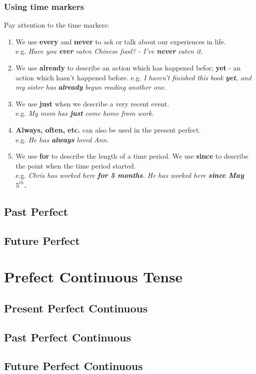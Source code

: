 \documentclass[hidelinks,10pt,a4paper]{article}
\begin{document}
\subsubsection{Using time markers}
Pay attention to the time markers:
\begin{enumerate}[label=(\alph*)]
	\item We use \textbf{every} and \textbf{never} to ask or talk about our experiences in life. \\
		e.g. \textit{Have you \textbf{ever} eaten Chinese food? - I've \textbf{never} eaten it. }
	\item We use \textbf{already} to describe an action which has happened befor; \textbf{yet} - an action which hasn't happened before.
		e.g. \textit{I haven't finished this book \textbf{yet}, and my sister has \textbf{already} begun reading another one.}
	\item We use \textbf{just} when we describe a very recent event. \\
		e.g. \textit{My mom has \textbf{just} come home from work.}
	\item \textbf{Always, often, etc.} can also be used in the present perfect. \\
		e.g. \textit{He has \textbf{always} loved Ann.}
	\item We use \textbf{for} to describe the length of a time period. We use \textbf{since} to describe the point when the time period started. \\
		e.g. \textit{Chris has worked here \textbf{for 5 months}. He has worked here \textbf{since May $5^{th}$.} }
\end{enumerate}

\subsection{Past Perfect}
\subsection{Future Perfect}

\section{Prefect Continuous Tense}
\subsection{Present Perfect Continuous}
\subsection{Past Perfect Continuous}
\subsection{Future Perfect Continuous}
\end{document}
